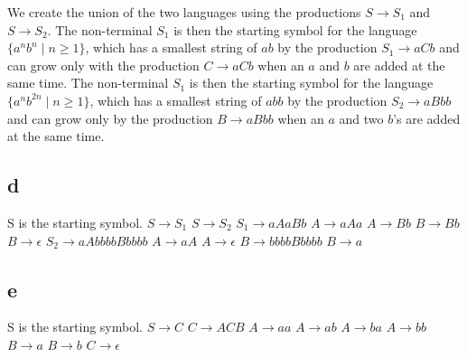 \documentclass[12pt]{article}
\begin{document}
We create the union of the two languages using the productions $S \rightarrow S_1$ and
$S \rightarrow S_2$. The non-terminal $S_1$ is then the starting symbol for the language $\{a^{n}b^{n}\mid n \geq 1\}$, which has a smallest string of $ab$ by the production $S_1 \rightarrow aCb$ and can grow only with the production $C \rightarrow aCb$ when an $a$ and $b$ are added at the same time. The non-terminal $S_1$ is then the starting symbol for the language $\{a^{n}b^{2n}\mid n \geq 1\}$, which has a smallest string of $abb$ by the production $S_2 \rightarrow aBbb$ and can grow only by the production $B \rightarrow aBbb$ when an $a$ and two $b$'s are added at the same time.

\subsection*{d} S is the starting symbol. \newline
$S \rightarrow S_1$ \newline
$S \rightarrow S_2$ \newline
$S_1 \rightarrow aAaBb$ \newline
$A \rightarrow aAa$ \newline
$A \rightarrow Bb$ \newline
$B \rightarrow Bb$ \newline
$B \rightarrow \epsilon $ \newline
$S_2 \rightarrow aAbbbbBbbbb$ \newline
$A \rightarrow aA$ \newline
$A \rightarrow \epsilon$ \newline
$B \rightarrow bbbbBbbbb$ \newline
$B \rightarrow a $ \newline



\subsection*{e} S is the starting symbol. \newline
$S \rightarrow C$ \newline
$C \rightarrow ACB$ \newline
$A \rightarrow aa$ \newline
$A \rightarrow ab$ \newline
$A \rightarrow ba$ \newline
$A \rightarrow bb$ \newline
$B \rightarrow a$ \newline
$B \rightarrow b$ \newline
$C \rightarrow \epsilon$ \newline
\end{document}
